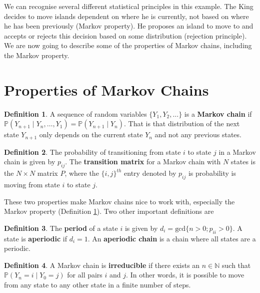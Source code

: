 \documentclass[
]{book}
\theoremstyle{definition}
\newtheorem{definition}{Definition}[chapter]
\theoremstyle{definition}
\theoremstyle{definition}
\theoremstyle{definition}
\theoremstyle{remark}
\begin{document}
We can recognise several different statistical principles in this example. The King decides to move islands dependent on where he is currently, not based on where he has been previously (Markov property). He proposes an island to move to and accepts or rejects this decision based on some distribution (rejection principle). We are now going to describe some of the properties of Markov chains, including the Markov property.

\hypertarget{properties-of-markov-chains}{%
\section{Properties of Markov Chains}\label{properties-of-markov-chains}}

\begin{definition}
\protect\hypertarget{def:Markov}{}\label{def:Markov}A sequence of random variables \(\{Y_1, Y_2, \ldots\}\) is a \textbf{Markov chain} if \(\mathbb{P}(Y_{n+1} \mid Y_{n}, \ldots, Y_1) = \mathbb{P}(Y_{n+1} \mid Y_{n})\). That is that distribution of the next state \(Y_{n+1}\) only depends on the current state \(Y_n\) and not any previous states.
\end{definition}

\begin{definition}
The probability of transitioning from state \(i\) to state \(j\) in a Markov chain is given by \(p_{ij}\). The \textbf{transition matrix} for a Markov chain with \(N\) states is the \(N \times N\) matrix \(P\), where the \(\{i, j\}^{th}\) entry denoted by \(p_{ij}\) is probability is moving from state \(i\) to state \(j\).
\end{definition}

These two properties make Markov chains nice to work with, especially the Markov property (Definition \ref{def:Markov}). Two other important definitions are

\begin{definition}
The \textbf{period }of a state \(i\) is given by \(d_i = \textrm{gcd}\{n > 0; p_{ii} > 0 \}\). A state is \textbf{aperiodic} if \(d_i = 1\). An \textbf{aperiodic chain} is a chain where all states are a periodic.
\end{definition}

\begin{definition}
A Markov chain is \textbf{irreducible} if there exists an \(n \in \mathbb{N}\) such that \(\mathbb{P} (Y_n = i \mid Y_0 = j)\) for all pairs \(i\) and \(j\). In other words, it is possible to move from any state to any other state in a finite number of steps.
\end{definition}
\end{document}
